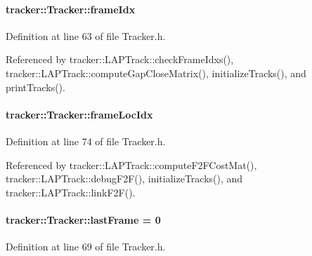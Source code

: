 \paragraph[{\texorpdfstring{frame\+Idx}{frameIdx}}]{ tracker\+::\+Tracker\+::frame\+Idx}\hypertarget{classtracker_1_1Tracker_aa3e32ff8183fe70af1d351f6324e7615}{}\label{classtracker_1_1Tracker_aa3e32ff8183fe70af1d351f6324e7615}


Definition at line 63 of file Tracker.\+h.



Referenced by tracker\+::\+L\+A\+P\+Track\+::check\+Frame\+Idxs(), tracker\+::\+L\+A\+P\+Track\+::compute\+Gap\+Close\+Matrix(), initialize\+Tracks(), and print\+Tracks().

\paragraph[{\texorpdfstring{frame\+Loc\+Idx}{frameLocIdx}}]{ tracker\+::\+Tracker\+::frame\+Loc\+Idx}\hypertarget{classtracker_1_1Tracker_a089a3af55a168691f56d856658786159}{}\label{classtracker_1_1Tracker_a089a3af55a168691f56d856658786159}


Definition at line 74 of file Tracker.\+h.



Referenced by tracker\+::\+L\+A\+P\+Track\+::compute\+F2\+F\+Cost\+Mat(), tracker\+::\+L\+A\+P\+Track\+::debug\+F2\+F(), initialize\+Tracks(), and tracker\+::\+L\+A\+P\+Track\+::link\+F2\+F().

\paragraph[{\texorpdfstring{last\+Frame}{lastFrame}}]{ tracker\+::\+Tracker\+::last\+Frame = 0}\hypertarget{classtracker_1_1Tracker_af3219a1e02551ca5c6aafc4a8c14ff30}{}\label{classtracker_1_1Tracker_af3219a1e02551ca5c6aafc4a8c14ff30}


Definition at line 69 of file Tracker.\+h.



